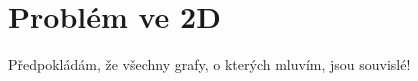 \chapter{Problém ve 2D}
\label{chap:problem2d}
Předpokládám, že všechny grafy, o kterých mluvím, jsou souvislé!





